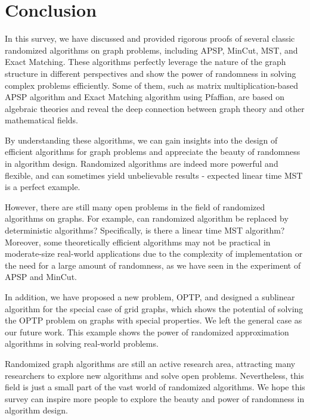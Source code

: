 \documentclass[11pt]{article}
\theoremstyle{plain}
\begin{document}
\section{Conclusion}

In this survey, we have discussed and provided rigorous proofs of several classic randomized algorithms on graph problems, including APSP, MinCut, MST, and Exact Matching. These algorithms  perfectly leverage the nature of the graph structure in different perspectives and show the power of randomness in solving complex problems efficiently. Some of them, such as matrix multiplication-based APSP algorithm and Exact Matching algorithm using Pfaffian, are based on algebraic theories and reveal the deep connection between graph theory and other mathematical fields.

By understanding these algorithms, we can gain insights into the design of efficient algorithms for graph problems and appreciate the beauty of randomness in algorithm design. Randomized algorithms are indeed more powerful and flexible, and can sometimes yield unbelievable results - expected linear time MST is a perfect example.

However, there are still many open problems in the field of randomized algorithms on graphs. For example, can randomized algorithm be replaced by deterministic algorithms? Specifically, is there a linear time MST algorithm? Moreover, some theoretically efficient algorithms may not be practical in moderate-size real-world applications due to the complexity of implementation or the need for a large amount of randomness, as we have seen in the experiment of APSP and MinCut.

In addition, we have proposed a new problem, \textsf{OPTP}, and designed a sublinear algorithm for the special case of grid graphs, which shows the potential of solving the \textsf{OPTP} problem on graphs with special properties. We left the general case as our future work. This example shows the power of randomized approximation algorithms in solving real-world problems.

Randomized graph algorithms are still an active research area, attracting many researchers to explore new algorithms and solve open problems. Nevertheless, this field is just a small part of the vast world of randomized algorithms. We hope this survey can inspire more people to explore the beauty and power of randomness in algorithm design.

\end{document}
